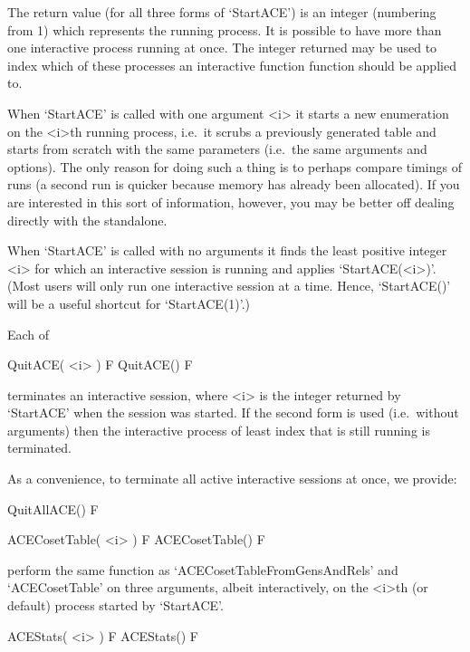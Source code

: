 The return value (for all three forms of  `StartACE')  is  an  integer
(numbering from  1)  which  represents  the  running  process.  It  is
possible to have more than one interactive process  running  at  once.
The integer returned may be used to index which of these processes  an
interactive function {\ACE} function should be applied to.

When `StartACE' is called with  one  argument  <i>  it  starts  a  new
enumeration on the <i>th running process, i.e.~it scrubs a  previously
generated table and starts  from  scratch  with  the  same  parameters
(i.e.~the same arguments and options). The only reason for doing  such
a thing is to perhaps compare timings of runs (a second run is quicker
because memory has already been allocated). If you are  interested  in
this sort of information, however,  you  may  be  better  off  dealing
directly with the standalone.

When `StartACE' is  called  with  no  arguments  it  finds  the  least
positive integer <i> for which an interactive session is  running  and
applies `StartACE(<i>)'. (Most users will  only  run  one  interactive
session at a time. Hence, `StartACE()' will be a useful  shortcut  for
`StartACE(1)'.)

Each of

\>QuitACE( <i> ) F
\>QuitACE() F

terminates an interactive {\ACE} session, where  <i>  is  the  integer
returned by `StartACE' when the session was  started.  If  the  second
form is used (i.e.~without arguments) then the interactive process  of
least index that is still running is terminated.

As a convenience, to terminate all active interactive {\ACE}  sessions
at once, we provide:

\>QuitAllACE() F



\>ACECosetTable( <i> ) F
\>ACECosetTable() F

perform  the  same  function  as  `ACECosetTableFromGensAndRels'   and
`ACECosetTable' on three arguments, albeit interactively, on the <i>th
(or default) process started by `StartACE'.

\>ACEStats( <i> ) F
\>ACEStats() F

